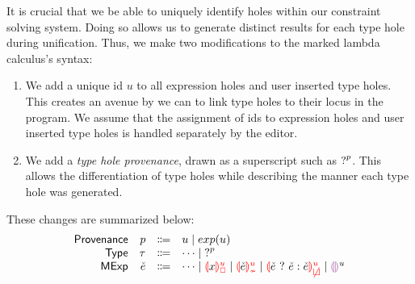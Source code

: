 \label{sec:typinf}
It is crucial that we be able to uniquely identify holes within our constraint solving system. Doing so allows us to generate distinct results for each type hole during unification. Thus, we make two modifications to the marked lambda calculus's syntax:
\begin{enumerate}
    \item We add a unique id $u$ to all expression holes and user inserted type holes. This creates an avenue by we can to link type holes to their locus in the program. We assume that the assignment of ids to expression holes and user inserted type holes is handled separately by the editor.
    \item We add a \emph{type hole provenance}, drawn as a superscript such as $\mathtt{?}^p$. This allows the differentiation of type holes while describing the manner each type hole was generated.
\end{enumerate}
  
These changes are summarized below:
\[\begin{array}{rrcl}
    \Prov & \Provp & \Coloneqq & u \mid exp(u) \\
    \TMName  & \TMV  & \Coloneqq & \dots \mid \TUnknown^{p}\\
    \ECMName & \ECMV & \Coloneqq & \dots \mid \ECUnboundId{x}{u} \mid \ECInconTypeId{\ECMV}{u} \mid \ECInconBrId{\ECMV}{\ECMV}{\ECMV}{u} \mid \EEHole^u
\end{array}\]


